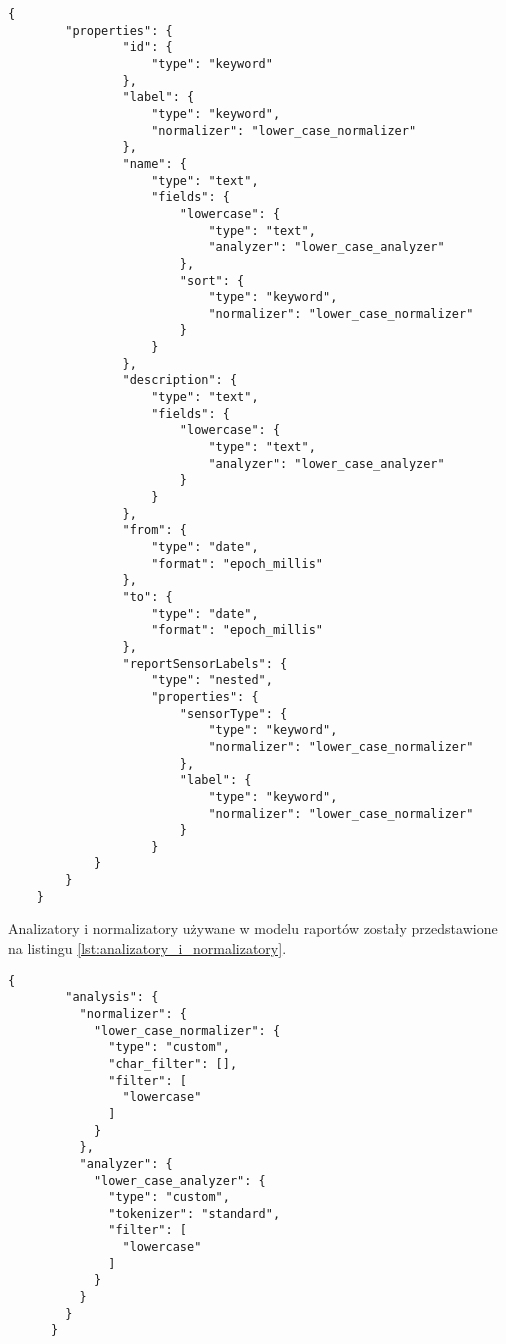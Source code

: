 \begin{lstlisting}[caption=Model raportów w bazie danych Elasticsearch, label={lst:model_raportow}]
    {
        "properties": {
                "id": {
                    "type": "keyword"
                },
                "label": {
                    "type": "keyword",
                    "normalizer": "lower_case_normalizer"
                },
                "name": {
                    "type": "text",
                    "fields": {
                        "lowercase": {
                            "type": "text",
                            "analyzer": "lower_case_analyzer"
                        },
                        "sort": {
                            "type": "keyword",
                            "normalizer": "lower_case_normalizer"
                        }
                    }
                },
                "description": {
                    "type": "text",
                    "fields": {
                        "lowercase": {
                            "type": "text",
                            "analyzer": "lower_case_analyzer"
                        }
                    }
                },
                "from": {
                    "type": "date",
                    "format": "epoch_millis"
                },
                "to": {
                    "type": "date",
                    "format": "epoch_millis"
                },
                "reportSensorLabels": {
                    "type": "nested",
                    "properties": {
                        "sensorType": {
                            "type": "keyword",
                            "normalizer": "lower_case_normalizer"
                        },
                        "label": {
                            "type": "keyword",
                            "normalizer": "lower_case_normalizer"
                        }
                    }
            }
        }
    }
    \end{lstlisting}


Analizatory i normalizatory używane w modelu raportów zostały przedstawione na listingu \ref{lst:analizatory_i_normalizatory}.

\begin{lstlisting}[caption=Analizatory i normalizatory w bazie danych Elasticsearch, label={lst:analizatory_i_normalizatory}]
    {
        "analysis": {
          "normalizer": {
            "lower_case_normalizer": {
              "type": "custom",
              "char_filter": [],
              "filter": [
                "lowercase"
              ]
            }
          },
          "analyzer": {
            "lower_case_analyzer": {
              "type": "custom",
              "tokenizer": "standard",
              "filter": [
                "lowercase"
              ]
            }
          }
        }
      }
\end{lstlisting}

